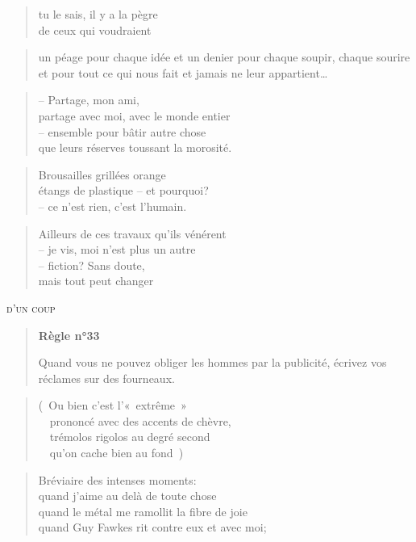   \begin{verse}
    tu le sais, il y a la pègre\\
    de ceux qui voudraient
  \end{verse}
  \begin{verse}
    un péage pour chaque idée et un denier pour chaque soupir, chaque sourire
    et pour tout ce qui nous fait et jamais ne leur appartient…
  \end{verse}
  \begin{verse}
    -- Partage, mon ami,\\
    partage avec moi, avec le monde entier\\
    -- ensemble pour bâtir autre chose\\
    que leurs réserves toussant la morosité.
  \end{verse}
  \begin{verse}
    Brousailles grillées orange\\
    étangs de plastique -- et pourquoi?\\
    -- ce n’est rien, c’est l’humain.
  \end{verse}
  \begin{verse}
    Ailleurs de ces travaux qu’ils vénérent\\
    -- je vis, moi n’est plus un autre\\
    -- fiction? Sans doute,\\
    mais tout peut changer
  \end{verse}
  \begin{center}
    \textsc{d’un coup}
  \end{center}
  \begin{quote}
    \textbf{Règle n°33}

    Quand vous ne pouvez obliger les hommes par la publicité,
    écrivez vos réclames sur des fourneaux.
  \end{quote}
  \begin{verse}
    (~Ou bien c’est l’«~extrême~»\\
    ~~prononcé avec des accents de chèvre,\\
    ~~trémolos rigolos au degré second\\
    ~~qu’on cache bien au fond~)
  \end{verse}
  \begin{verse}
    Bréviaire des intenses moments:\\
    quand j’aime au delà de toute chose\\
    quand le métal me ramollit la fibre de joie\\
    quand Guy Fawkes rit contre eux et avec moi;
  \end{verse}
